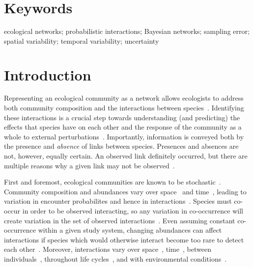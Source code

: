 \documentclass[12pt]{article}
\begin{document}
\begin{spacing}{2.0}
\section*{\small Keywords}

ecological networks; probabilistic interactions; Bayesian networks; sampling error; spatial variability; temporal variability; uncertainty

\linenumbers
\clearpage

\section*{Introduction}

    Representing an ecological community as a network allows ecologists to address both community composition and the interactions between species~\citep{Roslin2016}. Identifying these interactions is a crucial step towards understanding (and predicting) the effects that species have on each other and the response of the community as a whole to external perturbations~\citep{Bartomeus2016,Giron2018}. Importantly, information is conveyed both by the presence and \emph{absence} of links between species. Presences and absences are not, however, equally certain. An observed link definitely occurred, but there are multiple reasons why a given link may not be observed~\citep{Jordano2016}. 


    First and foremost, ecological communities are known to be stochastic~\citep{Gotelli2000}. Community composition and abundances vary over space~\citep{Baiser2012} and time~\citep{Olesen2011a}, leading to variation in encounter probabilites and hence in interactions~\citep{Vazquez2005,Poisot2015,Graham2018}. Species must co-occur in order to be observed interacting, so any variation in co-occurrence will create variation in the set of observed interactions~\citep{Gravel2013,Graham2018}. Even assuming constant co-occurrence within a given study system, changing abundances can affect interactions if species which would otherwise interact become too rare to detect each other~\citep{Tylianakis2010,Jordano2016}. Moreover, interactions vary over space~\citep{Kitching1987,Baiser2012,Emer2018}, time~\citep{Kitching1987,Olesen2011a,Lopez2017}, between individuals~\citep{Pires2011a,Wells2013,Fodrie2015,Novak2015}, throughout life cycles~\citep{Preston2014,Clegg2018}, and with environmental conditions~\citep{Poisot2015}.



\end{spacing}
\end{document}
